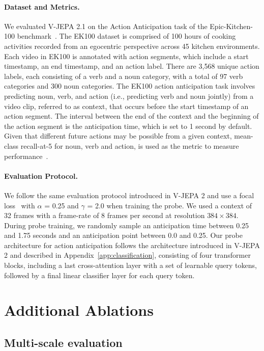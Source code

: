 \documentclass[]{fairmeta}
\begin{document}
\paragraph{\bf Dataset and Metrics.} We evaluated V-JEPA 2.1 on the Action Anticipation task of the Epic-Kitchen-100 benchmark~\cite{Damen2022rescaling}. The EK100 dataset is comprised of 100 hours of cooking activities recorded from an egocentric perspective across 45 kitchen environments. Each video in EK100 is annotated with action segments, which include a start timestamp, an end timestamp, and an action label. There are 3,568 unique action labels, each consisting of a verb and a noun category, with a total of 97 verb categories and 300 noun categories. The EK100 action anticipation task involves predicting noun, verb, and action (i.e., predicting verb and noun jointly) from a video clip, referred to as context, that occurs before the start timestamp of an action segment.
The interval between the end of the context and the beginning of the action segment is the anticipation time, which is set to 1 second by default. Given that different future actions may be possible from a given context, mean-class recall-at-5 for noun, verb and action, is used as the metric to measure performance~\citep{Damen2022rescaling}.

\paragraph{\bf Evaluation Protocol.} We follow the same evaluation protocol introduced in V-JEPA 2 and use a focal loss~\cite{lin2017focal} with $\alpha$ = 0.25 and $\gamma$ = 2.0 when training the probe. We used a context of 32 frames with a frame-rate of 8 frames per second at resolution $384 \times 384$. During probe training, we randomly sample an anticipation time between 0.25 and 1.75 seconds and an anticipation point between 0.0 and 0.25. Our probe architecture for action anticipation follows the architecture introduced in V-JEPA 2 and described in Appendix~\ref{app:classification}, consisting of four transformer blocks, including a last cross-attention layer with a set of learnable query tokens, followed by a final linear classifier layer for each query token.


\section{Additional Ablations}

\subsection{Multi-scale evaluation} \label{app:multiscale_evaluation}
\end{document}
